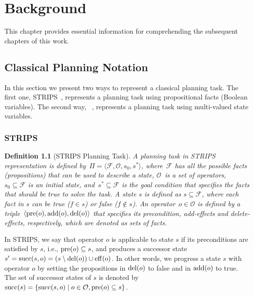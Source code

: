\documentclass[ppgc,diss,english]{iiufrgs}
\newtheorem{definition}{Definition}
\newcommand{\ppi}[2][inline]{\todo[color=purple!50,linecolor={purple!100},#1,fancyline,author=Pedro]{#2}}
\begin{document}
\chapter{Background}
\label{cha:background}
This chapter provides essential information for comprehending the subsequent chapters of this work.

\section{Classical Planning Notation}
\label{sec:background-planning-notation}
In this section we present two ways to represent a classical planning task. The first one, STRIPS~\cite{Fikes.Nilsson/1971}, represents a planning task using propositional facts (Boolean variables). The second way, \sas~\cite{Backstrom.Nebel/1995}, represents a planning task using multi-valued state variables. %
\ppi{WIP restrictions for STRIPS and \sas.}

\subsection{STRIPS}
\label{sec:background-strips}

\begin{definition}[STRIPS Planning Task]\label{def:strips}
A planning task in STRIPS representation is defined by~$\Pi=\langle\mathcal{F},\mathcal{O},s_{0},s^{*}\rangle$, where~$\mathcal{F}$ has all the possible facts (propositions) that can be used to describe a state, $\mathcal{O}$~is a set of operators,~$s_{0} \subseteq \mathcal{F}$ is an initial state, and~$s^{*} \subseteq \mathcal{F}$ is the goal condition that specifies the facts that should be true to solve the task.
A state $s$ is defined as $s \subseteq \mathcal{F}$, where each fact in $s$ can be true ($f \in s$) or false ($f \notin s$). %
An operator~$o \in \mathcal{O}$ is defined by a triple~$\langle\operatorname{pre}(o),\operatorname{add}(o),\operatorname{del}(o)\rangle$ that specifies its precondition, add-effects and delete-effects, respectively, which are denoted as sets of facts.
\end{definition}

In STRIPS, we say that operator $o$ is applicable to state $s$ if its preconditions are satisfied by $s$, i.e., $\operatorname{pre}(o) \subseteq s$, and produces a successor state~$s' = \operatorname{succ}(s,o) = (s \setminus \operatorname{del}(o)) \cup \operatorname{eff}(o)$. In other words, we progress a state $s$ with operator $o$ by setting the propositions in $\operatorname{del}(o)$ to false and in $\operatorname{add}(o)$ to true. The set of successor states of $s$ is denoted by~$\operatorname{succ}(s)=\{\operatorname{succ}(s,o)\mid o\in \mathcal{O}, \operatorname{pre}(o) \subseteq s\}$.
\end{document}
